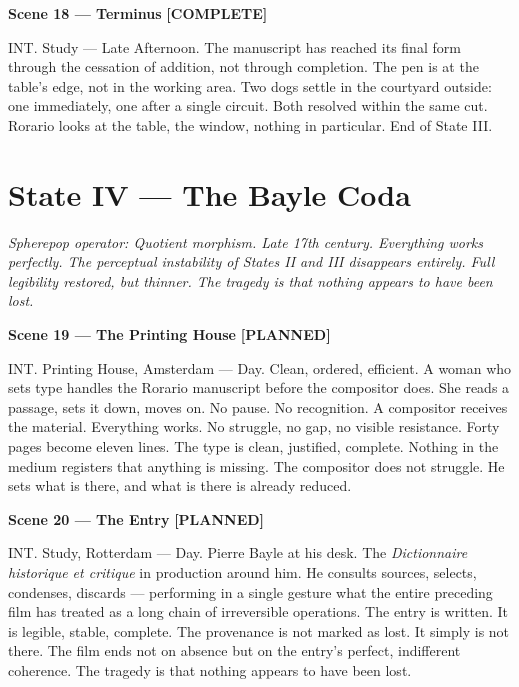 \documentclass[12pt, oneside]{amsart}
\newcommand{\statuscomplete}{{\small\bfseries\color{complete}[COMPLETE]}}
\newcommand{\statusplanned}{{\small\bfseries\color{planned}[PLANNED]}}
\begin{document}
\bigskip

\noindent\textbf{Scene 18 --- Terminus} \statuscomplete

\noindent INT. Study --- Late Afternoon. The manuscript has reached its final form through the cessation of addition, not through completion. The pen is at the table's edge, not in the working area. Two dogs settle in the courtyard outside: one immediately, one after a single circuit. Both resolved within the same cut. Rorario looks at the table, the window, nothing in particular. End of State III.

\section{State IV — The Bayle Coda}

\noindent\textit{Spherepop operator: Quotient morphism. Late 17th century. Everything works perfectly. The perceptual instability of States II and III disappears entirely. Full legibility restored, but thinner. The tragedy is that nothing appears to have been lost.}

\bigskip

\noindent\textbf{Scene 19 --- The Printing House} \statusplanned

\noindent INT. Printing House, Amsterdam --- Day. Clean, ordered, efficient. A woman who sets type handles the Rorario manuscript before the compositor does. She reads a passage, sets it down, moves on. No pause. No recognition. A compositor receives the material. Everything works. No struggle, no gap, no visible resistance. Forty pages become eleven lines. The type is clean, justified, complete. Nothing in the medium registers that anything is missing. The compositor does not struggle. He sets what is there, and what is there is already reduced.

\bigskip

\noindent\textbf{Scene 20 --- The Entry} \statusplanned

\noindent INT. Study, Rotterdam --- Day. Pierre Bayle at his desk. The \textit{Dictionnaire historique et critique} in production around him. He consults sources, selects, condenses, discards --- performing in a single gesture what the entire preceding film has treated as a long chain of irreversible operations. The entry is written. It is legible, stable, complete. The provenance is not marked as lost. It simply is not there. The film ends not on absence but on the entry's perfect, indifferent coherence. The tragedy is that nothing appears to have been lost.
\end{document}
